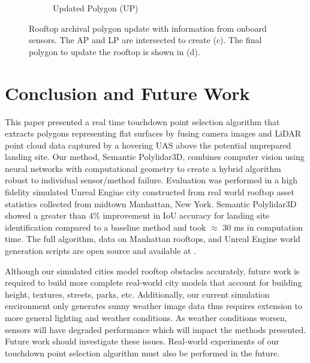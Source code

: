 \begin{figure}[ht]
\begin{subfigure}[t]{.30\linewidth}
    \caption{Updated Polygon (UP)\label{fig:ch6_map_update_d}}
  \end{subfigure}
  \caption[Proposed rooftop archival polygon update procedure]{Rooftop archival polygon update with information from onboard sensors. The AP and LP are intersected to create (c). The final polygon to update the rooftop is shown in (d).  }\label{fig:ch6_map_upate}
\end{figure}


\section{Conclusion and Future Work}\label{sec:ch6_conclusions}

This paper presented a real time touchdown point selection algorithm that extracts polygons representing flat surfaces by fusing camera images and LiDAR point cloud data captured by a hovering UAS above the potential unprepared landing site. 
Our method, Semantic Polylidar3D, combines computer vision using neural networks with computational geometry to create a hybrid algorithm robust to individual sensor/method failure. Evaluation was performed in a high fidelity simulated Unreal Engine city constructed from real world rooftop asset statistics collected from midtown Manhattan, New York. Semantic Polylidar3D showed a greater than 4\% improvement in IoU accuracy for landing site identification compared to a baseline method and took  $\approx$ 30 ms in computation time. The full algorithm, data on Manhattan rooftops, and Unreal Engine world generation scripts are open source and available at \cite{Castagno_Github_UnrealLanding}.

Although our simulated cities model rooftop obstacles accurately, future work is required to build more complete real-world city models that account for building height, textures, streets, parks,  etc. Additionally, our current simulation environment only generates sunny weather image data thus requires extension to more general lighting and weather conditions. As weather conditions worsen, sensors will have degraded performance which will impact the methods presented. Future work should investigate these issues.  Real-world experiments of our touchdown point selection algorithm must also be performed in the future.